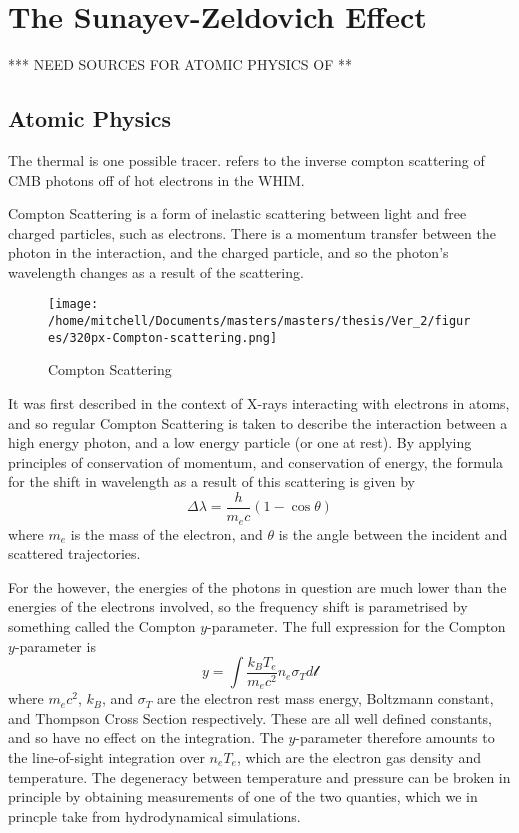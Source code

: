 \chapter{The Sunayev-Zeldovich Effect}
*** NEED SOURCES FOR ATOMIC PHYSICS OF \sze ***
\section{Atomic Physics}
The thermal \sze is one possible tracer. \sze refers to the inverse compton scattering of CMB photons off of hot electrons in the WHIM. 

Compton Scattering is a form of inelastic scattering between light and free charged particles, such as electrons. There is a momentum transfer between the photon in the interaction, and the charged particle, and so the photon's wavelength changes as a result of the scattering. 

\begin{figure}
\centering
\texttt{[image: /home/mitchell/Documents/masters/masters/thesis/Ver\_2/figures/320px-Compton-scattering.png]}
\label{fig:compton_scattering}
\caption{Compton Scattering}
\end{figure}


It was first described in the context of X-rays interacting with electrons in atoms, and so regular Compton Scattering is taken to describe the interaction between a high energy photon, and a low energy particle (or one at rest). By applying principles of conservation of momentum, and conservation of energy,  the formula for the shift in wavelength as a result of this scattering is given by
\begin{equation}
	\Delta \lambda = \frac{h}{m_ec}\left(1-\cos\theta\right)
	\label{eqn:compton_shift}
\end{equation}
where $m_e$ is the mass of the electron, and $\theta$ is the angle between the incident and scattered trajectories.

For the \sze however, the energies of the photons in question are much lower than the energies of the electrons involved, so the frequency shift is parametrised by something called the Compton $y$-parameter. The full expression for the Compton $y$-parameter is 
\begin{equation}
y = \int \frac{k_B T_e}{m_e c^2} n_e \sigma_T d\mathcal{l}
\label{eqn:y_param}
\end{equation}
where $m_e c^2$, $k_B$, and $\sigma_T$ are the electron rest mass energy, Boltzmann constant, and Thompson Cross Section respectively. These are all well defined constants, and so have no effect on the integration. The $y$-parameter therefore amounts to the line-of-sight integration over $n_e T_e$, which are the electron gas density and temperature. The degeneracy between temperature and pressure can be broken in principle by obtaining measurements of one of the two quanties, which we in princple take from hydrodynamical simulations.

